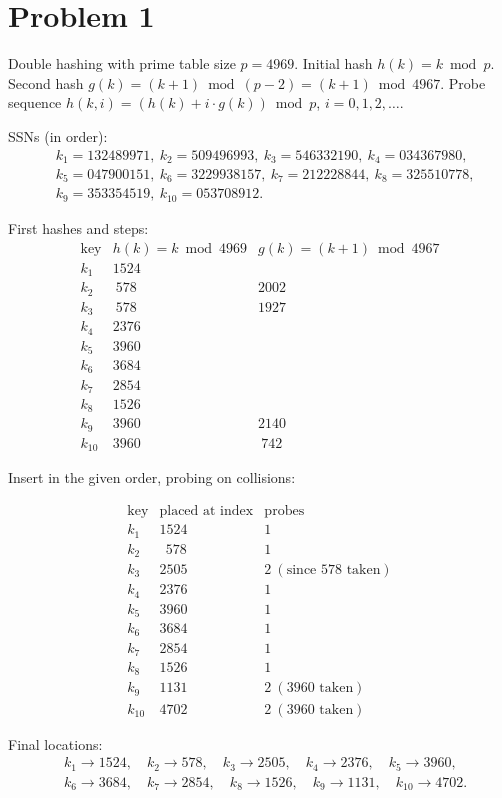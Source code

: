 \section*{Problem 1}

Double hashing with prime table size \(p=4969\).  
Initial hash \(h(k)=k \bmod p\).  
Second hash \(g(k)=(k+1)\bmod(p-2)=(k+1)\bmod 4967\).  
Probe sequence \(h(k,i)=(h(k)+i\cdot g(k))\bmod p\), \(i=0,1,2,\ldots\).

SSNs (in order):
\[
\begin{aligned}
&k_1=132489971,\ k_2=509496993,\ k_3=546332190,\ k_4=034367980,\\
&k_5=047900151,\ k_6=3229938157,\ k_7=212228844,\ k_8=325510778,\\
&k_9=353354519,\ k_{10}=053708912.
\end{aligned}
\]

First hashes and steps:
\[
\begin{array}{c|c|c}
\text{key} & h(k)=k\bmod 4969 & g(k)=(k+1)\bmod 4967\\\hline
k_1 & 1524 &  \\
k_2 &  \ 578 & 2002\\
k_3 &  \ 578 & 1927\\
k_4 & 2376 &  \\
k_5 & 3960 &  \\
k_6 & 3684 &  \\
k_7 & 2854 &  \\
k_8 & 1526 &  \\
k_9 & 3960 & 2140\\
k_{10} & 3960 & \ 742
\end{array}
\]

Insert in the given order, probing on collisions:

\[
\begin{array}{c|c|c}
\text{key} & \text{placed at index} & \text{probes}\\\hline
k_1 & 1524 & 1\\
k_2 & \ \ 578 & 1\\
k_3 & 2505 & 2\ (\text{since }578\text{ taken})\\
k_4 & 2376 & 1\\
k_5 & 3960 & 1\\
k_6 & 3684 & 1\\
k_7 & 2854 & 1\\
k_8 & 1526 & 1\\
k_9 & 1131 & 2\ (\text{3960 taken})\\
k_{10} & 4702 & 2\ (\text{3960 taken})
\end{array}
\]

Final locations:
\[
\boxed{
\begin{aligned}
&k_1\to 1524,\quad k_2\to 578,\quad k_3\to 2505,\quad k_4\to 2376,\quad k_5\to 3960,\\
&k_6\to 3684,\quad k_7\to 2854,\quad k_8\to 1526,\quad k_9\to 1131,\quad k_{10}\to 4702.
\end{aligned}}
\]
